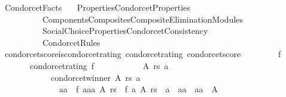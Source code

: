 %
\begin{isabellebody}%
%
%
\isadelimtheory
%
\endisadelimtheory
%
\isatagtheory
{}\isamarkupfalse%
\ Condorcet{\isacharunderscore}{\kern0pt}Facts\isanewline
\ \ \ {\isachardoublequoteopen}{\isachardot}{\kern0pt}{\isachardot}{\kern0pt}{\isacharslash}{\kern0pt}Properties{\isacharslash}{\kern0pt}Condorcet{\isacharunderscore}{\kern0pt}Properties{\isachardoublequoteclose}\isanewline
\ \ \ \ \ \ \ \ \ \ {\isachardoublequoteopen}{\isachardot}{\kern0pt}{\isachardot}{\kern0pt}{\isacharslash}{\kern0pt}Components{\isacharslash}{\kern0pt}Composites{\isacharslash}{\kern0pt}Composite{\isacharunderscore}{\kern0pt}Elimination{\isacharunderscore}{\kern0pt}Modules{\isachardoublequoteclose}\isanewline
\ \ \ \ \ \ \ \ \ \ {\isachardoublequoteopen}{\isachardot}{\kern0pt}{\isachardot}{\kern0pt}{\isacharslash}{\kern0pt}{\isachardot}{\kern0pt}{\isachardot}{\kern0pt}{\isacharslash}{\kern0pt}Social{\isacharunderscore}{\kern0pt}Choice{\isacharunderscore}{\kern0pt}Properties{\isacharslash}{\kern0pt}Condorcet{\isacharunderscore}{\kern0pt}Consistency{\isachardoublequoteclose}\isanewline
\ \ \ \ \ \ \ \ \ \ Condorcet{\isacharunderscore}{\kern0pt}Rules\isanewline
\isanewline
{}%
\endisatagtheory
{\isafoldtheory}%
%
\isadelimtheory
\isanewline
%
\endisadelimtheory
\isanewline
\isanewline
{}\isamarkupfalse%
\ condorcet{\isacharunderscore}{\kern0pt}score{\isacharunderscore}{\kern0pt}is{\isacharunderscore}{\kern0pt}condorcet{\isacharunderscore}{\kern0pt}rating{\isacharcolon}{\kern0pt}\ {\isachardoublequoteopen}condorcet{\isacharunderscore}{\kern0pt}rating\ condorcet{\isacharunderscore}{\kern0pt}score{\isachardoublequoteclose}\isanewline
%
\isadelimproof
%
\endisadelimproof
%
\isatagproof
{}\isamarkupfalse%
\ {\isacharminus}{\kern0pt}\isanewline
\ \ \isamarkupfalse%
\isanewline
\ \ \ \ {\isachardoublequoteopen}{\isasymforall}f{\isachardot}{\kern0pt}\isanewline
\ \ \ \ \ \ {\isacharparenleft}{\kern0pt}{\isasymnot}\ condorcet{\isacharunderscore}{\kern0pt}rating\ f\ {\isasymlongrightarrow}\isanewline
\ \ \ \ \ \ \ \ \ \ {\isacharparenleft}{\kern0pt}{\isasymexists}A\ rs\ a{\isachardot}{\kern0pt}\isanewline
\ \ \ \ \ \ \ \ \ \ \ \ condorcet{\isacharunderscore}{\kern0pt}winner\ A\ rs\ a\ {\isasymand}\isanewline
\ \ \ \ \ \ \ \ \ \ \ \ \ \ {\isacharparenleft}{\kern0pt}{\isasymexists}aa{\isachardot}{\kern0pt}\ {\isasymnot}\ f\ {\isacharparenleft}{\kern0pt}aa{\isacharcolon}{\kern0pt}{\isacharcolon}{\kern0pt}{\isacharprime}{\kern0pt}a{\isacharparenright}{\kern0pt}\ A\ rs\ {\isacharless}{\kern0pt}\ f\ a\ A\ rs\ {\isasymand}\ a\ {\isasymnoteq}\ aa\ {\isasymand}\ aa\ {\isasymin}\ A{\isacharparenright}{\kern0pt}{\isacharparenright}{\kern0pt}{\isacharparenright}{\kern0pt}\ {\isasymand}\isanewline

\end{isabellebody}
